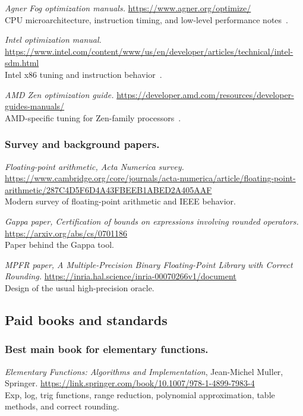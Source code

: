 \documentclass[manuscript, nonacm]{acmart}
\begin{document}
  \emph{Agner Fog optimization manuals.}
  \url{https://www.agner.org/optimize/}\\
  CPU microarchitecture, instruction timing, and low-level performance
  notes~\cite{fog}.

  \emph{Intel optimization manual.}
  \url{https://www.intel.com/content/www/us/en/developer/articles/technical/intel-sdm.html}\\
  Intel x86 tuning and instruction behavior~\cite{intel}.

  \emph{AMD Zen optimization guide.}
  \url{https://developer.amd.com/resources/developer-guides-manuals/}\\
  AMD-specific tuning for Zen-family processors~\cite{amd}.

  \subsubsection{Survey and background papers.}

  \emph{Floating-point arithmetic, Acta Numerica survey.}
  \url{https://www.cambridge.org/core/journals/acta-numerica/article/floating-point-arithmetic/287C4D5F6D4A43FBEEB1ABED2A405AAF}\\
  Modern survey of floating-point arithmetic and IEEE behavior.

  \emph{Gappa paper, Certification of bounds on expressions involving rounded
  operators.}
  \url{https://arxiv.org/abs/cs/0701186}\\
  Paper behind the Gappa tool.

  \emph{MPFR paper, A Multiple-Precision Binary Floating-Point Library with
  Correct Rounding.}
  \url{https://inria.hal.science/inria-00070266v1/document}\\
  Design of the usual high-precision oracle.

  \subsection{Paid books and standards}

  \subsubsection{Best main book for elementary functions.}

  \emph{Elementary Functions: Algorithms and Implementation}, Jean-Michel
  Muller, Springer.
  \url{https://link.springer.com/book/10.1007/978-1-4899-7983-4}\\
  Exp, log, trig functions, range reduction, polynomial approximation, table
  methods, and correct rounding.
\end{document}

